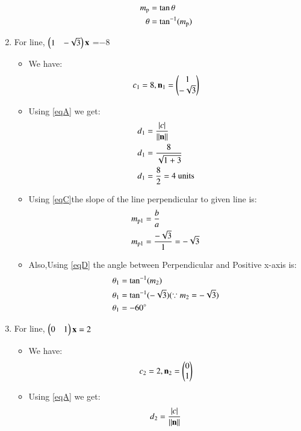 \documentclass[journal,12pt,twocolumn]{IEEEtran}
\begin{document}
\begin{enumerate}
\begin{itemize}
\begin{align}
  m\textsubscript{p}&=\tan \theta
  \\
  \theta &= \tan^{-1}( m\textsubscript{p})\label{eqD}
\end{align}
\end{itemize}
\item For line, $\begin{pmatrix}1&-\sqrt{3}\end{pmatrix}\mathbf{x}$ =$-8$
\begin{itemize}
\item We have:
\begin{align}
 c\textsubscript{1}=8 , {\mathbf{n\textsubscript{1}}}=\begin{pmatrix}1\\-\sqrt{3}\end{pmatrix}   
\end{align}
\item Using \eqref{eqA} we get:
\begin{align}
d\textsubscript{1}&=\frac { \left| c \right| }{\lVert\mathbf{n}\rVert}
\\
d\textsubscript{1}&=\frac{8}{\sqrt{1+3}} 
\\
d\textsubscript{1}&=\frac{8}{2}=4\text{ units}
\end{align}
\item Using \eqref{eqC}the slope of the line perpendicular to given line is:
\begin{align}
  m\textsubscript{p1}&=\frac{b}{a}
  \\
  m\textsubscript{p1}&=\frac{-\sqrt{3}}{1}=-\sqrt{3}
\end{align}
 \item Also,Using \eqref{eqD} the angle between Perpendicular and Positive x-axis is:
 \begin{align}
  \theta\textsubscript{1} &= \tan^{-1}( m\textsubscript{2})
  \\
 \theta\textsubscript{1} &= \tan^{-1}(-\sqrt{3}) (\because m\textsubscript{2}=-\sqrt{3})
 \\
 \theta\textsubscript{1} &= -60\degree
\end{align}
\end{itemize}
\item For line, $\begin{pmatrix}0&1\end{pmatrix}\mathbf{x} =2$
\begin{itemize}
\item We have:
\begin{align}
 c\textsubscript{2}=2 ,{\mathbf{n\textsubscript{2}}}=\begin{pmatrix}0\\1\end{pmatrix}   
\end{align}
\item Using \eqref{eqA} we get:
\begin{align}
d\textsubscript{2}&=\frac { \left| c \right| }{\norm{\vec{n}}}
\\

\end{align}
\end{itemize}
\end{enumerate}
\end{document}
